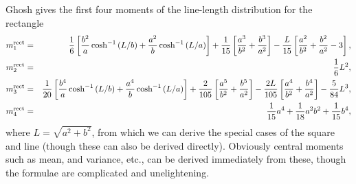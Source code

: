 Ghosh \cite{b.ghosh51:_random_rect} gives the first four moments of
the line-length distribution for the rectangle
\begin{eqnarray}
  \label{eq:rect_moments} 
  m^{\rm rect}_1 & = & \frac{1}{6} \left[ 
                        \frac{b^2}{a} \cosh^{-1}\left( L/b \right) +
                        \frac{a^2}{b} \cosh^{-1}\left( L/a \right) 
                 \right]
                  + \frac{1}{15} \left[ \frac{a^3}{b^2} + \frac{b^3}{a^2} \right]
                  - \frac{L}{15} \left[ \frac{a^2}{b^2} + \frac{b^2}{a^2} -3 \right],
\\
  m^{\rm rect}_2 & = & \frac{1}{6} L^2, \\
  m^{\rm rect}_3 & = & \frac{1}{20} \left[ 
                        \frac{b^4}{a} \cosh^{-1}\left( L/b \right) +
                        \frac{a^4}{b} \cosh^{-1}\left( L/a \right) 
                 \right]
                  + \frac{2}{105} \left[ \frac{a^5}{b^2} + \frac{b^5}{a^2} \right]
                  - \frac{2L}{105} \left[ \frac{a^4}{b^2} + \frac{b^4}{a^2}\right]
                        - \frac{5}{84} L^3, 
\\
  m^{\rm rect}_4 & = & \frac{1}{15} a^4 + \frac{1}{18} a^2 b^2 + \frac{1}{15} b^4,
  \label{eq:rect_moments_end} 
\end{eqnarray}
where $L = \sqrt{a^2 + b^2}$, from which we can derive the special
cases of the square and line (though these can also be derived
directly). Obviously central moments such as mean, and variance, etc.,
can be derived immediately from these, though the formulae are
complicated and unelightening.
